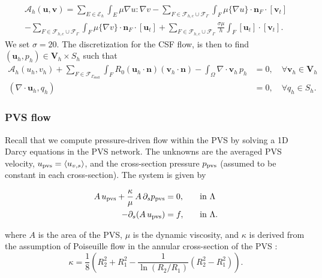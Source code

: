 \documentclass[fleqn,10pt]{wlscirep}
\begin{document}
\begin{multline}
\mathcal{A}_h (\bm u, \bm v) = \sum_{E \in \mathcal{E}_h} \int_{E} \mu \nabla u : \nabla v - \sum_{
F \in \mathcal{F}_{h,c} \cup \mathcal{F}_{\Gamma} 
} \int_{F} \mu \{\nabla u\}\cdot \bm n_F \cdot [\bm v_t] 
\\ - \sum_{
F \in \mathcal{F}_{h,c} \cup \mathcal{F}_{\Gamma} 
} \int_{F} \mu \{\nabla v\}\cdot \bm n_F \cdot [\bm u_t]
+ \sum_{
F \in \mathcal{F}_{h,c} \cup \mathcal{F}_{\Gamma} 
} \frac{\sigma \mu}{h} \int_{F} [\bm u_t ] \cdot [\bm v_t].   
\end{multline}
We set $\sigma =20$. The discretization for the CSF flow, is then to find $(\bm u_h, p_h) \in \bm V_h \times S_h$ such  that 
\begin{align}
\mathcal{A}_h(u_h, v_h)  + \sum_{F \in \mathcal{F}_{\Gamma_{\mathrm{skull}}}} \int_{F} R_0 (\bm u_h \cdot \bm n) (\bm v_h \cdot \bm n) - \int_{\Omega} \nabla \cdot \bm v_h \, p_h  & = 0, \quad \forall \bm v_h \in \bm V_h   \\ 
(\nabla \cdot \bm u_h , q_h ) & = 0, \quad \forall q_h \in S_h.
\end{align}
\subsubsection{PVS flow} 


Recall that we compute pressure-driven flow within the PVS by solving a 1D Darcy equations in the PVS network. The unknowns are the averaged PVS velocity, $u_{\rm pvs} = \langle u_{v,s} \rangle$, and the cross-section pressure $p_{\rm pvs} $ (assumed to be constant in each cross-section). The system is given by  \cite{daversin2022geometrically, 
gjerde2024directional} 

\begin{alignat}{2}
A \,  u_{\rm pvs}   + \frac{\kappa}{\mu} \, A \, \partial_{s} p_{\rm pvs} & = 0, &&  \quad \rm in  \,\, \Lambda  \\ 
-\partial_s (A \, u_{\rm pvs}) & = f, && \quad \rm in  \,\, \Lambda .  
\end{alignat} 

where $A$ is the area of the PVS, $\mu$ is the dynamic viscosity, and $\kappa$ is derived from the assumption of Poiseuille flow in the annular cross-section of the PVS  \cite{daversin2022geometrically,tithof2022network}: 
\begin{equation}
\kappa = \frac18 \left( R_2^2 + R_1^2 - \frac{1}{\ln(R_2/R_1)} (R_2^2- R_1^2) \right). 
\end{equation}
\end{document}
